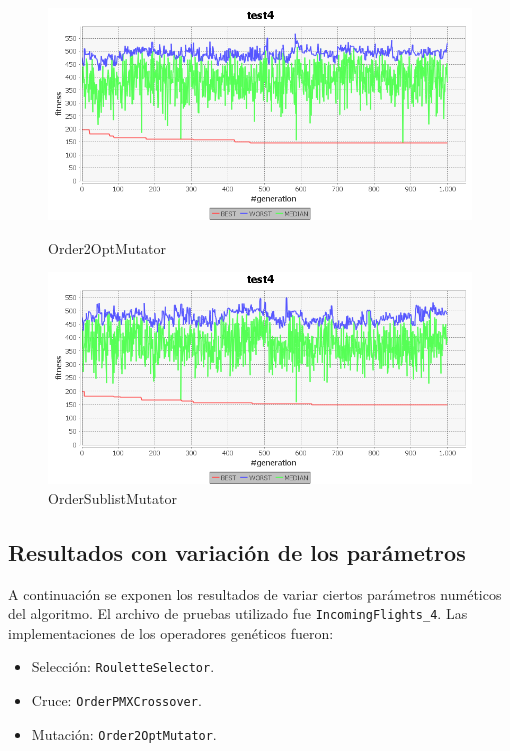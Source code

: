 \documentclass[a4paper,12pt,titlepage]{article}
\begin{document}
\begin{figure}[!ht]
\centering
\begin{minipage}{.5\textwidth}
  \centering
  \includegraphics[width=\textwidth]{Order2OptMutator.png}
  \caption{Order2OptMutator}
\end{minipage}%
\begin{minipage}{.5\textwidth}
  \centering
  \includegraphics[width=\textwidth]{OrderSublistMutator.png}
  \caption{OrderSublistMutator}
\end{minipage}
\end{figure}

\subsection{Resultados con variación de los parámetros}

A continuación se exponen los resultados de variar ciertos parámetros numéticos del algoritmo. El archivo de pruebas utilizado fue \lstinline|IncomingFlights_4|. Las implementaciones de los operadores genéticos fueron:

\begin{itemize}[noitemsep]
	\item Selección: \lstinline|RouletteSelector|.
	\item Cruce: \lstinline|OrderPMXCrossover|.
	\item Mutación: \lstinline|Order2OptMutator|.	
\end{itemize}
\end{document}
